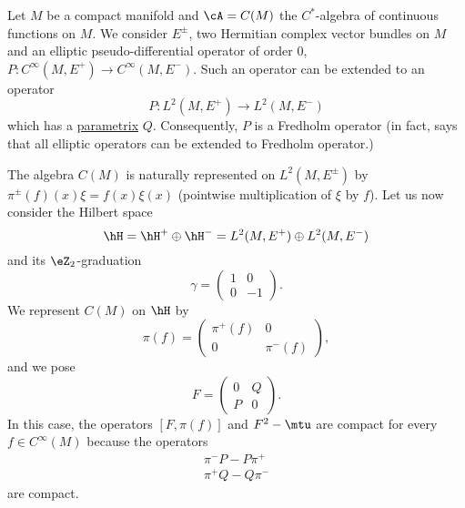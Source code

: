 Let $M$ be a compact manifold and $\cA=C(M)$ the $C^*$-algebra of continuous functions on $M$. We consider $E^{\pm}$, two Hermitian complex vector bundles on $M$ and an elliptic pseudo-differential operator of order $0$, $P\colon  C^{\infty}(M,E^+)\to  C^{\infty}(M,E^-)$. Such an operator can be extended to an operator 
\begin{equation}
	P\colon L^2(M,E^+)\to L^2(M,E^-)
\end{equation}
which has a \hyperlink{DefParametrix}{parametrix} $Q$. Consequently, $P$ is a Fredholm operator (in fact,  says that all elliptic operators can be extended to Fredholm operator.)

The algebra $C(M)$ is naturally represented on $L^2(M,E^{\pm})$ by $\pi^{\pm}(f)(x)\xi=f(x)\xi(x)$ (pointwise multiplication of $\xi$ by $f$). Let us now consider the Hilbert space 
\begin{equation}
	\hH=\hH^+\oplus\hH^-=L^2(M,E^{+})\oplus L^2(M,E^{-})
\end{equation}
and its $\eZ_2$-graduation
\begin{equation}
	\gamma=\begin{pmatrix}
		1	&	0	\\ 
		0	&	-1	
	\end{pmatrix}.
\end{equation}
We represent $C(M)$ on $\hH$ by
\begin{equation}
	\pi(f)=\begin{pmatrix}
		\pi^+(f)	&	0	\\ 
		0	&	\pi^-(f)	
	\end{pmatrix},
\end{equation}
and we pose
\begin{equation}
	F=\begin{pmatrix}
		0	&	Q	\\ 
		P	&	0	
	\end{pmatrix}.
\end{equation}
In this case, the operators $[F,\pi(f)]$ and $F^2-\mtu$ are compact for every $f\in  C^{\infty}(M)$ because the operators
\begin{subequations}
	\begin{align}
		\pi^-P-P\pi^+\\
		\pi^+Q-Q\pi^-
	\end{align}
\end{subequations}
are compact.

